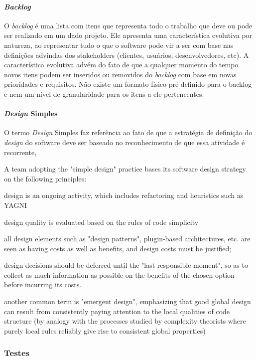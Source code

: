 \documentclass[
	article,			%
	11pt,				%
	oneside,			%
	a4paper,			%
	english,			%
	brazil,				%
	sumario=tradicional
	]{abntex2}
\begin{document}
\paragraph*{\emph{Backlog}}
O \emph{backlog} é uma lista com itens que representa todo o trabalho que deve ou pode ser realizado em um dado projeto. Ele apresenta uma característica evolutiva por natureza, ao representar tudo o que o software pode vir a ser com base nas definições advindas dos stakeholders (clientes, usuários, desenvolvedores, etc). A característica evolutiva advém do fato de que a qualquer momento do tempo novos itens podem ser inseridos ou removidos do \emph{backlog} com base em novas prioridades e requisitos. Não existe um formato físico pré-definido para o backlog e nem um nível de granularidade para os itens a ele pertencentes.

\paragraph*{\emph{Design} Simples}
O termo \emph{Design} Simples faz referência ao fato de que a estratégia de definição do \emph{design} do software deve ser baseado no reconhecimento de que essa atividade é recorrente, 

A team adopting the "simple design" practice bases its software design strategy on the following principles:

design is an ongoing activity, which includes refactoring and heuristics such as YAGNI

design quality is evaluated based on the rules of code simplicity

all design elements such as "design patterns", plugin-based architectures, etc. are seen as having costs as well as benefits, and design costs must be justified;

design decisions should be deferred until the "last responsible moment", so as to collect as much information as possible on the benefits of the chosen option before incurring its costs.

another common term is "emergent design", emphasizing that good global design can result from consistently paying attention to the local qualities of code structure (by analogy with the processes studied by complexity theorists where purely local rules reliably give rise to consistent global properties)


\subsubsection*{Testes}
\end{document}
